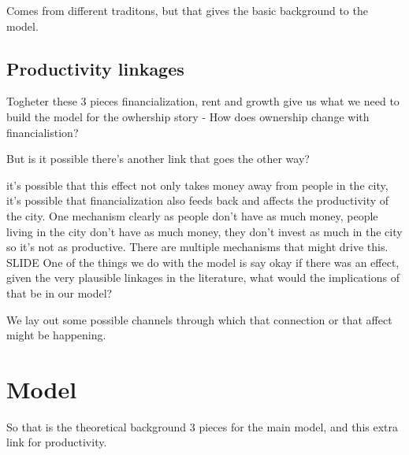 \documentclass[]{article}
\begin{document}
Comes from different traditons, but that gives the basic background to the model.


\subsection{Productivity linkages}

Togheter these 3 pieces financialization, rent and growth give us what we need to build the model for the owhership story - How does ownership change with financialistion?


But is it possible there's another link that goes the other way?

it's  possible that this effect not only takes money away from people in the city, it's possible that financialization also feeds back and  affects the productivity of the city. One mechanism clearly as people don't have as much money, people living in the city don't have as much money, they don't invest as much in the city so it's not as productive. 
There are multiple mechanisms that might drive this. SLIDE
One of the things we do with the model is say okay if there was an effect, given the very plausible linkages in the literature, what would the implications of that be in our model?

We lay out some possible channels through which that connection or that affect might be happening.

\section{Model}

So that is the theoretical background 3 pieces for the main model, and this extra link for productivity. 
\end{document}
